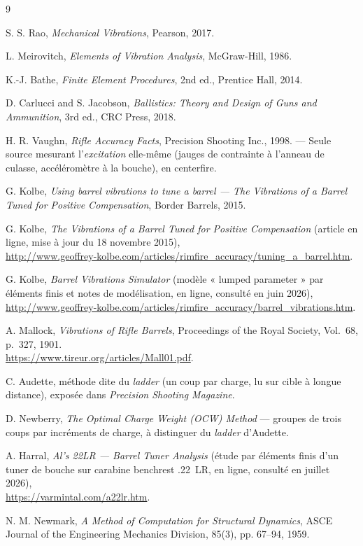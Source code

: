 \documentclass[12pt,a4paper]{article}
\begin{document}
	\begin{thebibliography}{9}

		S. S. Rao, \textit{Mechanical Vibrations}, Pearson, 2017.

		L. Meirovitch, \textit{Elements of Vibration Analysis}, McGraw-Hill, 1986.

		K.-J. Bathe, \textit{Finite Element Procedures}, 2nd ed., Prentice Hall, 2014.

		D. Carlucci and S. Jacobson, \textit{Ballistics: Theory and Design of Guns and Ammunition}, 3rd ed., CRC Press, 2018.

		H. R. Vaughn, \textit{Rifle Accuracy Facts}, Precision Shooting Inc., 1998. --- Seule source mesurant l'\emph{excitation} elle-m\^eme (jauges de contrainte \`a l'anneau de culasse, acc\'el\'erom\`etre \`a la bouche), en centerfire.

		G. Kolbe, \textit{Using barrel vibrations to tune a barrel — The Vibrations of a Barrel Tuned for Positive Compensation}, Border Barrels, 2015.

		G. Kolbe, \textit{The Vibrations of a Barrel Tuned for Positive Compensation} (article en ligne, mise à jour du 18 novembre 2015),\\
		\url{http://www.geoffrey-kolbe.com/articles/rimfire_accuracy/tuning_a_barrel.htm}.

		G. Kolbe, \textit{Barrel Vibrations Simulator} (modèle « lumped parameter » par éléments finis et notes de modélisation, en ligne, consulté en juin 2026),\\
		\url{http://www.geoffrey-kolbe.com/articles/rimfire_accuracy/barrel_vibrations.htm}.

		A. Mallock, \textit{Vibrations of Rifle Barrels}, Proceedings of the Royal Society, Vol.~68, p.~327, 1901.\\
		\url{https://www.tireur.org/articles/Mall01.pdf}.

		C. Audette, m\'ethode dite du \emph{ladder} (un coup par charge, lu sur cible \`a longue distance),
		expos\'ee dans \textit{Precision Shooting Magazine}.

		D. Newberry, \textit{The Optimal Charge Weight (OCW) Method} --- groupes de trois coups par
		incr\'ements de charge, \`a distinguer du \emph{ladder} d'Audette.

		A. Harral, \textit{Al's 22LR --- Barrel Tuner Analysis} (étude par éléments finis d'un tuner de bouche sur carabine benchrest .22~LR, en ligne, consulté en juillet 2026),\\
		\url{https://varmintal.com/a22lr.htm}.

		N. M. Newmark, \textit{A Method of Computation for Structural Dynamics}, ASCE Journal of the Engineering Mechanics Division, 85(3), pp. 67--94, 1959.

	\end{thebibliography}
\end{document}
